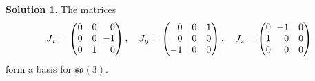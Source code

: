 \documentclass[11pt, a4paper]{report}
\theoremstyle{definition}
\newtheorem{solution}{Solution}[part]
\newenvironment{sol}{\begin{solution}}{\end{solution}\pagebreak[3]}
\newcommand*{\m}{\ensuremath\:\, \mathllap{-}}
\begin{document}
\begin{sol}

The matrices
\[
    J_x =
        \begin{pmatrix*}[r]
            0 & 0 & 0 \\
            0 & 0 & \m 1 \\
            0 & 1 & 0 \\
        \end{pmatrix*}, \quad
    J_y =
        \begin{pmatrix*}[r]
            0  & 0 & 1 \\
            0  & 0 & 0 \\
            -1 & 0 & 0 \\
        \end{pmatrix*}, \quad
    J_z =
        \begin{pmatrix*}[r]
            0 & \m 1 & 0 \\
            1 & 0 & 0 \\
            0 & 0 & 0 \\
        \end{pmatrix*}
\]
form a basis for $\mathfrak{so}(3)$.


\end{sol}
\end{document}
